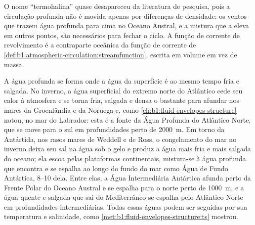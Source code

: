 O nome ``termohalina'' quase desapareceu da literatura de pesquisa, pois a circulação profunda não é
movida apenas por diferenças de densidade: os ventos que trazem água profunda para cima no
Oceano Austral, e a mistura que a eleva em outros pontos, são necessários
para fechar o ciclo. A função de corrente de revolvimento é a contraparte oceânica da
função de corrente de \cref{def:b1:atmospheric-circulation:streamfunction},
escrita em volume em vez de massa.

A água profunda se forma onde a água da superfície é ao mesmo tempo fria e salgada. No inverno, a
água superficial do extremo norte do Atlântico cede seu calor à atmosfera e se torna
fria, salgada e densa o bastante para afundar nos mares da Groenlândia e da Noruega e, como
\cref{ch:b1:fluid-envelopes-structure} notou, no mar do Labrador: esta é a
fonte da Água Profunda do Atlântico Norte, que se move para o sul em profundidades perto de
\qty{2000}{m}. Em torno da Antártida, nos rasos
mares de Weddell e de Ross, o congelamento do mar no inverno deixa seu sal na água
sob o gelo e produz a água mais fria e mais salgada do oceano; ela escoa
pelas plataformas continentais, mistura-se à água profunda que encontra e se espalha ao longo
do fundo do mar como Água de Fundo Antártica, \qtyrange{8}{10}{\sverdrup} dela. Entre
elas, a Água Intermediária Antártica afunda perto da Frente Polar do Oceano Austral
e se espalha para o norte perto de \qty{1000}{m}, e a água quente e salgada que sai do
Mediterrâneo se espalha pelo Atlântico Norte em profundidades intermediárias. Todas essas
águas podem ser seguidas por sua temperatura e salinidade, como
\cref{met:b1:fluid-envelopes-structure:ts} mostrou.

